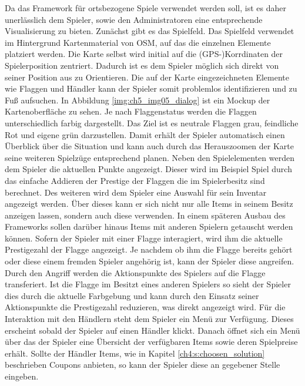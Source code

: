 Da das Framework für ortsbezogene Spiele verwendet werden soll, ist es daher unerlässlich dem Spieler, sowie den Administratoren eine entsprechende Visualisierung zu bieten. Zunächst gibt es das Spielfeld. Das Spielfeld verwendet im Hintergrund Kartenmaterial von OSM, auf das die einzelnen Elemente platziert werden. Die Karte selbst wird initial auf die (GPS-)Korrdinaten der Spielerposition zentriert. Dadurch ist es dem Spieler möglich sich direkt von seiner Position aus zu Orientieren. Die auf der Karte eingezeichneten Elemente wie Flaggen und Händler kann der Spieler somit problemlos identifizieren und zu Fuß aufsuchen. In Abbildung \ref{img:ch5_img05_dialog} ist ein Mockup der Kartenoberfläche zu sehen. Je nach Flaggenstatus werden die Flaggen unterschiedlich farbig dargestellt. Das Ziel ist es neutrale Flaggen grau, feindliche Rot und eigene grün darzustellen. Damit erhält der Spieler automatisch einen Überblick über die Situation und kann auch durch das Herauszoomen der Karte seine weiteren Spielzüge entsprechend planen.
Neben den Spielelementen werden dem Spieler die aktuellen Punkte angezeigt. Dieser wird im Beispiel Spiel durch das einfache Addieren der Prestige der Flaggen die im Spielerbesitz sind berechnet. Des weiteren wird dem Spieler eine Auswahl für sein Inventar angezeigt werden.
Über dieses kann er sich nicht nur alle Items in seinem Besitz anzeigen lassen, sondern auch diese verwenden. In einem späteren Ausbau des Frameworks sollen darüber hinaus Items mit anderen Spielern getauscht werden können.
Sofern der Spieler mit einer Flagge interagiert, wird ihm die aktuelle Prestigezahl der Flagge angezeigt. Je nachdem ob ihm die Flagge bereits gehört oder diese einem fremden Spieler angehörig ist, kann der Spieler diese \glqq angreifen\grqq. Durch den Angriff werden die Aktionspunkte des Spielers auf die Flagge transferiert. Ist die Flagge im Besitzt eines anderen Spielers so sieht der Spieler dies durch die aktuelle Farbgebung und kann durch den Einsatz seiner Aktionspunkte die Prestigezahl reduzieren, was direkt angezeigt wird. Für die Interaktion mit den Händlern steht dem Spieler ein Menü zur Verfügung. Dieses erscheint sobald der Spieler auf einen Händler klickt. Danach öffnet sich ein Menü über das der Spieler eine Übersicht der verfügbaren Items sowie deren Spielpreise erhält. Sollte der Händler Items, wie in Kapitel \ref{ch4:s:choosen_solution} beschrieben Coupons anbieten, so kann der Spieler diese an gegebener Stelle eingeben.

